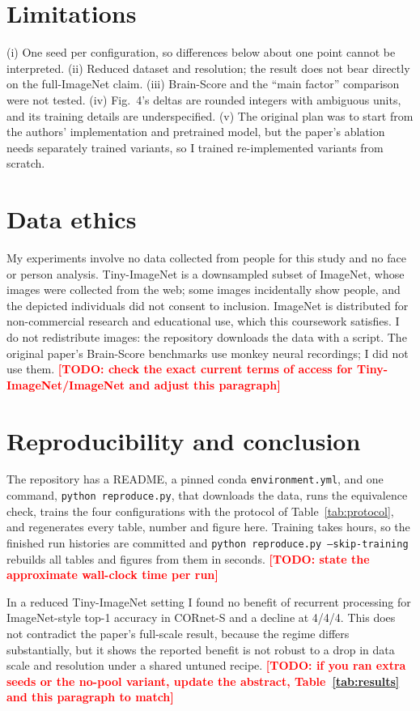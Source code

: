 \documentclass[conference]{IEEEtran}
\newcommand{\todo}[1]{\textcolor{red}{\textbf{[TODO: #1]}}}
\begin{document}
\section{Limitations}
(i) One seed per configuration, so differences below about one point cannot be interpreted. (ii) Reduced dataset and resolution; the result does not bear directly on the full-ImageNet claim. (iii) Brain-Score and the ``main factor'' comparison were not tested. (iv) Fig.~4's deltas are rounded integers with ambiguous units, and its training details are underspecified. (v) The original plan was to start from the authors' implementation and pretrained model, but the paper's ablation needs separately trained variants, so I trained re-implemented variants from scratch.

\section{Data ethics}
My experiments involve no data collected from people for this study and no face or person analysis. Tiny-ImageNet \cite{tinyimagenet} is a downsampled subset of ImageNet, whose images were collected from the web; some images incidentally show people, and the depicted individuals did not consent to inclusion. ImageNet is distributed for non-commercial research and educational use, which this coursework satisfies. I do not redistribute images: the repository downloads the data with a script. The original paper's Brain-Score benchmarks use monkey neural recordings; I did not use them. \todo{check the exact current terms of access for Tiny-ImageNet/ImageNet and adjust this paragraph}

\section{Reproducibility and conclusion}
The repository has a README, a pinned conda \texttt{environment.yml}, and one command, \texttt{python reproduce.py}, that downloads the data, runs the equivalence check, trains the four configurations with the protocol of Table~\ref{tab:protocol}, and regenerates every table, number and figure here. Training takes hours, so the finished run histories are committed and \texttt{python reproduce.py --skip-training} rebuilds all tables and figures from them in seconds. \todo{state the approximate wall-clock time per run}

In a reduced Tiny-ImageNet setting I found no benefit of recurrent processing for ImageNet-style top-1 accuracy in CORnet-S and a decline at 4/4/4. This does not contradict the paper's full-scale result, because the regime differs substantially, but it shows the reported benefit is not robust to a drop in data scale and resolution under a shared untuned recipe. \todo{if you ran extra seeds or the no-pool variant, update the abstract, Table~\ref{tab:results} and this paragraph to match}
\end{document}
